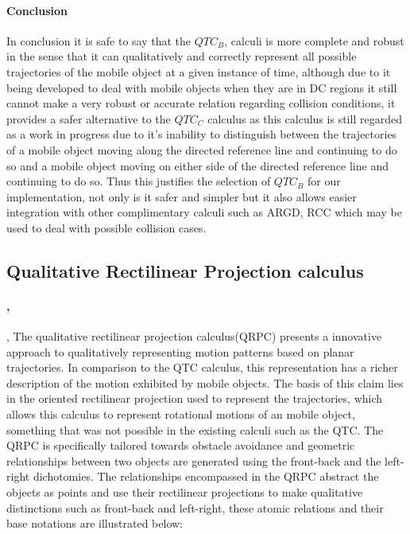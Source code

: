 	\paragraph{Conclusion}\cite{van2004representing}In conclusion it is safe to say that the $QTC_B$, calculi is more complete and robust in the sense that it can qualitatively and correctly represent all possible trajectories of the mobile object at a given instance of time, although due to it being developed to deal with mobile objects when they are in DC regions \cite{van2006qualitative} it still cannot make a very robust or accurate relation regarding collision conditions, it provides a safer alternative to the $QTC_C$ calculus as this calculus is still regarded as a work in progress \cite{van2005qualitative}due to it's inability to distinguish between the trajectories of a mobile object moving along the directed reference line and continuing to do so and a mobile object moving on either side of the directed reference line and continuing to do so. Thus this justifies the selection of $QTC_B$ for our implementation, not only is it safer and simpler but it also allows easier integration with other complimentary calculi such as ARGD, RCC which may be used to deal with possible collision cases.

	\subsection{Qualitative Rectilinear Projection calculus}
	\paragraph{\cite{glez2013qrpc}, \cite{alvarez2006guide}}, 	\cite{delafontaine2011implementing} The qualitative rectilinear projection calculus(QRPC) presents a innovative approach to qualitatively representing motion patterns based on planar trajectories. In comparison to the QTC calculus, this representation has a richer description of the motion exhibited by mobile objects. The basis of this claim lies in the oriented rectilinear projection used to represent the trajectories, which allows this calculus to represent rotational motions of an mobile object, something that was not possible in the existing calculi such as the QTC. The QRPC is specifically tailored towards obstacle avoidance and geometric relationships between two objects are generated using the front-back and the left-right dichotomies. The relationships encompassed in the QRPC abstract the objects as points and use their rectilinear projections to make qualitative distinctions such as front-back and left-right, these atomic relations and their base notations are illustrated below:
	
